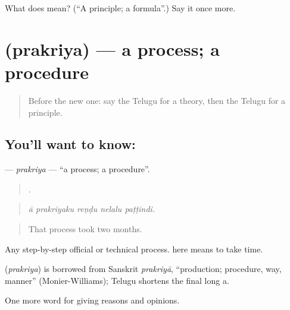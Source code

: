 \begin{tcolorbox}[breakable,colback=teal!4,colframe=teal!35!black,title={Before you move on}]
What does  mean? (\textquotedblleft{}A principle; a formula\textquotedblright{}.) Say it once more.
\end{tcolorbox}
\section[\texorpdfstring{\te{ప్రక్రియ} (prakriya)}{ప్రక్రియ (prakriya)}]{ (prakriya) — a process; a procedure}

\label{lesson:TE-C390-prakriya}



\begin{quote}
Before the new one: say the Telugu for a theory, then the Telugu for a principle.
\end{quote}

\subsection*{You'll want to know: }
\textbf{} — \emph{prakriya} — \textquotedblleft{}a process; a procedure\textquotedblright{}.

\begin{quote}
    .
\end{quote}

\begin{quote}
\emph{ā prakriyaku reṇḍu nelalu paṭṭindi.}
\end{quote}

\begin{quote}
That process took two months.
\end{quote}

Any step-by-step official or technical process.  here means to take time.

\begin{cousinweb}
\textbf{} (\emph{prakriya}) is borrowed from Sanskrit \emph{prakriyā}, \textquotedblleft{}production; procedure, way, manner\textquotedblright{} (Monier-Williams); Telugu shortens the final long a.
\end{cousinweb}

\begin{grammarlens}[title={What you've built}]
One more word for giving reasons and opinions.
\end{grammarlens}

